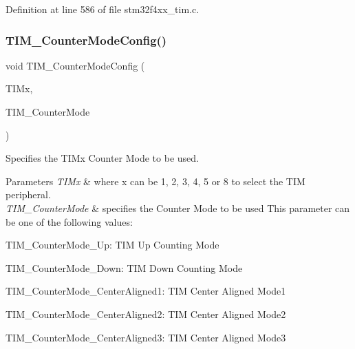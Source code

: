 Definition at line 586 of file stm32f4xx\+\_\+tim.\+c.

\mbox{\label{group___t_i_m___group1_ga93941c1db20bf3794f377307df90a67b}} 
\subsubsection{\texorpdfstring{T\+I\+M\+\_\+\+Counter\+Mode\+Config()}{TIM\_CounterModeConfig()}}
{\footnotesize\ttfamily void T\+I\+M\+\_\+\+Counter\+Mode\+Config (\begin{DoxyParamCaption}\item[{\hyperlink{struct_t_i_m___type_def}{T\+I\+M\+\_\+\+Type\+Def} $\ast$}]{T\+I\+Mx,  }\item[{uint16\+\_\+t}]{T\+I\+M\+\_\+\+Counter\+Mode }\end{DoxyParamCaption})}



Specifies the T\+I\+Mx Counter Mode to be used. 


\begin{DoxyParams}{Parameters}
{\em T\+I\+Mx} & where x can be 1, 2, 3, 4, 5 or 8 to select the T\+IM peripheral. \\
\hline
{\em T\+I\+M\+\_\+\+Counter\+Mode} & specifies the Counter Mode to be used This parameter can be one of the following values\+: \begin{DoxyItemize}
\item T\+I\+M\+\_\+\+Counter\+Mode\+\_\+\+Up\+: T\+IM Up Counting Mode \item T\+I\+M\+\_\+\+Counter\+Mode\+\_\+\+Down\+: T\+IM Down Counting Mode \item T\+I\+M\+\_\+\+Counter\+Mode\+\_\+\+Center\+Aligned1\+: T\+IM Center Aligned Mode1 \item T\+I\+M\+\_\+\+Counter\+Mode\+\_\+\+Center\+Aligned2\+: T\+IM Center Aligned Mode2 \item T\+I\+M\+\_\+\+Counter\+Mode\+\_\+\+Center\+Aligned3\+: T\+IM Center Aligned Mode3 \end{DoxyItemize}
\\
\hline
\end{DoxyParams}

